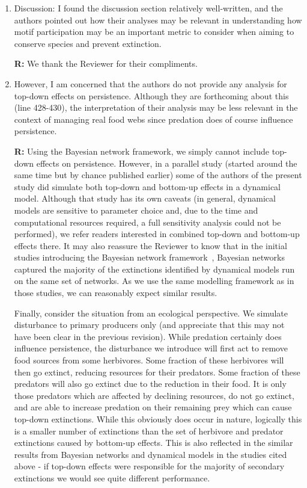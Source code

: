 \documentclass[12pt]{article}
\begin{document}
\begin{enumerate}
            \item Discussion: I found the discussion section relatively well-written, and the authors pointed out how their analyses may be relevant in understanding how motif participation may be an important metric to consider when aiming to conserve species and prevent extinction.

                \textbf{R:} We thank the Reviewer for their compliments.


            \item However, I am concerned that the authors do not provide any analysis for top-down effects on persistence. Although they are forthcoming about this (line 428-430), the interpretation of their analysis may be less relevant in the context of managing real food webs since predation does of course influence persistence.

                \textbf{R:} Using the Bayesian network framework, we simply cannot include top-down effects on persistence. However, in a parallel study (started around the same time but by chance published earlier) some of the authors of the present study did simulate both top-down and bottom-up effects in a dynamical model. Although that study has its own caveats (in general, dynamical models are sensitive to parameter choice and, due to the time and computational resources required, a full sensitivity analysis could not be performed), we refer readers interested in combined top-down and bottom-up effects there. 
                It may also reassure the Reviewer to know that in the initial studies introducing the Bayesian network framework~\citep{Eklof2013}, Bayesian networks captured the majority of the extinctions identified by dynamical models run on the same set of networks. As we use the same modelling framework as in those studies, we can reasonably expect similar results.


                Finally, consider the situation from an ecological perspective. We simulate disturbance to primary producers only (and appreciate that this may not have been clear in the previous revision). While predation certainly does influence persistence, the disturbance we introduce will first act to remove food sources from some herbivores. Some fraction of these herbivores will then go extinct, reducing resources for their predators. Some fraction of these predators will also go extinct due to the reduction in their food. It is only those predators which are affected by declining resources, do not go extinct, and are able to increase predation on their remaining prey which can cause top-down extinctions. While this obviously does occur in nature, logically this is a smaller number of extinctions than the set of herbivore and predator extinctions caused by bottom-up effects. This is also reflected in the similar results from Bayesian networks and dynamical models in the studies cited above - if top-down effects were responsible for the majority of secondary extinctions we would see quite different performance.



\end{enumerate}
\end{document}

